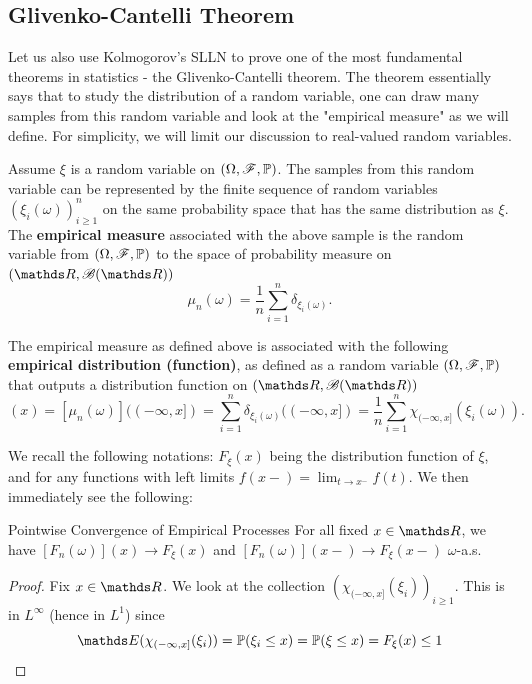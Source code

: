 \subsection{Glivenko-Cantelli Theorem}
\begin{unexaminable}
Let us also use Kolmogorov's SLLN to prove one of the most fundamental theorems in statistics - the Glivenko-Cantelli theorem. The theorem essentially says that to study the distribution of a random variable, one can draw many samples from this random variable and look at the "empirical measure" as we will define. For simplicity, we will limit our discussion to real-valued random variables.

\begin{definition}
Assume $\xi$ is a random variable on $(\Omega, \mathcal{F}, \mathbb{P})$. The samples from this random variable can be represented by the finite sequence of random variables $(\xi_i(\omega))_{i \geq 1}^n$ on the same probability space that has the same distribution as $\xi$. The \textbf{empirical measure} associated with the above sample is the random variable from $(\Omega,\mathcal{F},\mathbb{P})$ to the space of probability measure on $(\R,\B(\R))$
\begin{equation}
\mu_n(\omega) = \frac{1}{n} \sum_{i=1}^n \delta_{\xi_i(\omega)}.
\end{equation}

The empirical measure as defined above is associated with the following \textbf{empirical distribution (function)}, as defined as a random variable $(\Omega,\mathcal{F},\mathbb{P})$ that outputs a distribution function on $(\R,\B(\R))$
\begin{equation}
    [F_n(\omega)](x) = [\mu_n(\omega)]((-\infty,x]) = \sum_{i=1}^n \delta_{\xi_i(\omega)}((-\infty,x]) = \frac{1}{n} \sum_{i=1}^n \chi_{(-\infty, x]}(\xi_i(\omega)).
\end{equation}
\end{definition}

We recall the following notations: $F_\xi(x)$ being the distribution function of $\xi$, and for any functions with left limits $f(x-) = \lim_{t \to x^-} f(t)$. We then immediately see the following:

\begin{lemma}{Pointwise Convergence of Empirical Processes}{}
For all fixed $x\in \R$, we have $[F_n(\omega)](x) \to F_\xi(x)$ and $[F_n(\omega)](x-) \to F_\xi(x-)$ $\omega$-a.s.
\end{lemma}

\begin{proof}
Fix $x \in \R$. We look at the collection $(\chi_{(-\infty,x]}(\xi_i))_{i \geq 1}$. This is in $L^\infty$ (hence in $L^1$) since 
\begin{equation*}
\E(\chi_{(-\infty,x]}(\xi_i)) = \p(\xi_i \leq x) = \p(\xi \leq x) = F_\xi(x) \leq 1
\end{equation*}


\end{proof}
\end{unexaminable}
